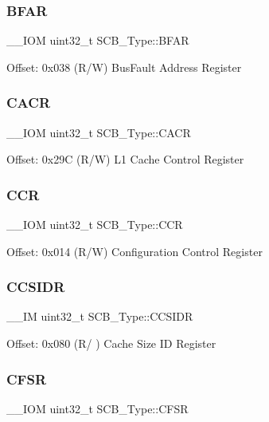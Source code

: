 \subsubsection{\texorpdfstring{BFAR}{BFAR}}
{\footnotesize\ttfamily \+\_\+\+\_\+\+I\+OM uint32\+\_\+t S\+C\+B\+\_\+\+Type\+::\+B\+F\+AR}

Offset\+: 0x038 (R/W) Bus\+Fault Address Register \mbox{\label{structSCB__Type_a51f9bd107a4e1d46ba647384e5c825b5}} 
\subsubsection{\texorpdfstring{CACR}{CACR}}
{\footnotesize\ttfamily \+\_\+\+\_\+\+I\+OM uint32\+\_\+t S\+C\+B\+\_\+\+Type\+::\+C\+A\+CR}

Offset\+: 0x29C (R/W) L1 Cache Control Register \mbox{\label{structSCB__Type_a2d6653b0b70faac936046a02809b577f}} 
\subsubsection{\texorpdfstring{CCR}{CCR}}
{\footnotesize\ttfamily \+\_\+\+\_\+\+I\+OM uint32\+\_\+t S\+C\+B\+\_\+\+Type\+::\+C\+CR}

Offset\+: 0x014 (R/W) Configuration Control Register \mbox{\label{structSCB__Type_afd063c9297a1a3b67e6d1d5e179e6a0e}} 
\subsubsection{\texorpdfstring{CCSIDR}{CCSIDR}}
{\footnotesize\ttfamily \+\_\+\+\_\+\+IM uint32\+\_\+t S\+C\+B\+\_\+\+Type\+::\+C\+C\+S\+I\+DR}

Offset\+: 0x080 (R/ ) Cache Size ID Register \mbox{\label{structSCB__Type_a0cda9e061b42373383418663092ad19a}} 
\subsubsection{\texorpdfstring{CFSR}{CFSR}}
{\footnotesize\ttfamily \+\_\+\+\_\+\+I\+OM uint32\+\_\+t S\+C\+B\+\_\+\+Type\+::\+C\+F\+SR}

